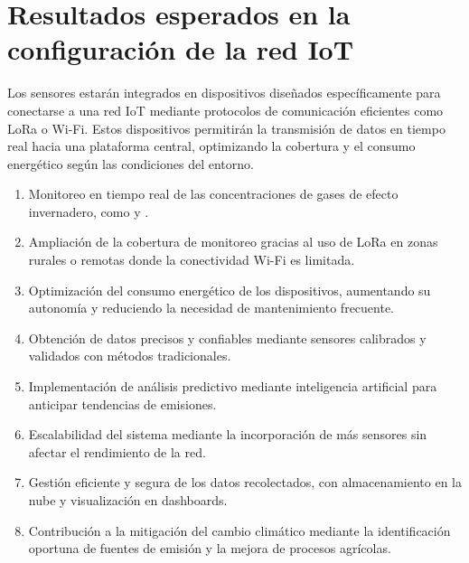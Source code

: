 \section{Resultados esperados en la configuración de la red IoT}

Los sensores estarán integrados en dispositivos diseñados específicamente para conectarse a una red IoT mediante protocolos de comunicación eficientes como LoRa o Wi-Fi. Estos dispositivos permitirán la transmisión de datos en tiempo real hacia una plataforma central, optimizando la cobertura y el consumo energético según las condiciones del entorno.

\begin{enumerate}[label=\Roman*.]
    \item Monitoreo en tiempo real de las concentraciones de gases de efecto invernadero, como  y .
    \item Ampliación de la cobertura de monitoreo gracias al uso de LoRa en zonas rurales o remotas donde la conectividad Wi-Fi es limitada.
    \item Optimización del consumo energético de los dispositivos, aumentando su autonomía y reduciendo la necesidad de mantenimiento frecuente.
    \item Obtención de datos precisos y confiables mediante sensores calibrados y validados con métodos tradicionales.
    \item Implementación de análisis predictivo mediante inteligencia artificial para anticipar tendencias de emisiones.
    \item Escalabilidad del sistema mediante la incorporación de más sensores sin afectar el rendimiento de la red.
    \item Gestión eficiente y segura de los datos recolectados, con almacenamiento en la nube y visualización en dashboards.
    \item Contribución a la mitigación del cambio climático mediante la identificación oportuna de fuentes de emisión y la mejora de procesos agrícolas.
\end{enumerate}
